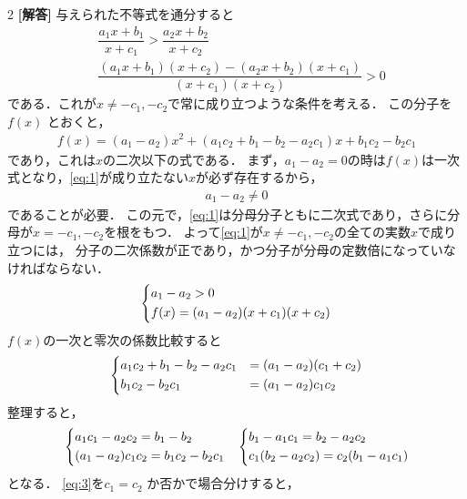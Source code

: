 \documentclass[../../main.tex]{subfiles}
\begin{document}
\setcounter{equation}{0}
\begin{oframed}
  
\end{oframed}
\setlength{\columnseprule}{0.4pt}
\begin{multicols}{2}
  {\bf [解答]}
  与えられた不等式を通分すると
  \begin{align}
    & \dfrac{a_1x+b_1}{x+c_1} > \dfrac{a_2x+b_2}{x+c_2}   \\
    & \dfrac{(a_1 x + b_1)(x + c_2) - (a_2 x + b_2)(x + c_1)}{(x + c_1)(x + c_2)} > 0 \label{eq:1}
  \end{align}
  である．これが$x\neq -c_1,-c_2$で常に成り立つような条件を考える．
  この分子を $f(x)$ とおくと，
  \begin{align}
    f(x) = (a_1 - a_2)x^2 + (a_1 c_2 + b_1 - b_2 - a_2 c_1)x + b_1 c_2 - b_2 c_1
  \end{align}
  であり，これは$x$の二次以下の式である．
  まず，$a_1-a_2=0$の時は$f(x)$は一次式となり，\cref{eq:1}が成り立たない$x$が必ず存在するから，
  \begin{align}
    a_1-a_2 \neq 0\label{eq:2}
  \end{align}
  であることが必要．
  この元で，\cref{eq:1}は分母分子ともに二次式であり，さらに分母が$x=-c_1,-c_2$を根をもつ．
  よって\cref{eq:1}が$x\neq -c_1,-c_2$の全ての実数$x$で成り立つには，
  分子の二次係数が正であり，かつ分子が分母の定数倍になっていなければならない．
  \begin{align}
    \begin{dcases}
      a_1-a_2 > 0 \\
      f(x) = (a_1-a_2)(x+c_1)(x+c_2)
    \end{dcases}
  \end{align}
  $f(x)$の一次と零次の係数比較すると
  \begin{align}
    \begin{dcases}
      a_1 c_2 + b_1 - b_2 - a_2 c_1 & = (a_1 - a_2)(c_1 + c_2) \\
      b_1 c_2 - b_2 c_1             & = (a_1 - a_2)c_1 c_2
    \end{dcases}
  \end{align}
  整理すると，
  \begin{align}
    &
    \begin{dcases}
      a_1 c_1 - a_2 c_2 = b_1 - b_2 \\
      (a_1 - a_2)c_1 c_2 = b_1 c_2 - b_2 c_1
    \end{dcases}
    &
    \begin{dcases}
      b_1 - a_1 c_1 = b_2 - a_2 c_2 \\
      c_1(b_2 - a_2 c_2) = c_2(b_1 - a_1 c_1)
    \end{dcases} \label{eq:3}
  \end{align}
  となる．
  \cref{eq:3}を$c_1 = c_2$ か否かで場合分けすると，


\end{multicols}
\end{document}
